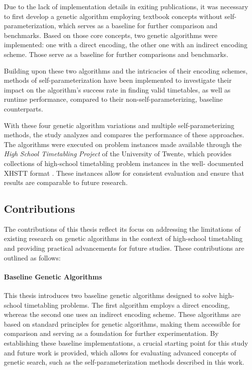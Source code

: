 \documentclass[english,examples]{isasthesis}
\begin{document}
Due to the lack of implementation details in exiting publications,
it was necessary to first develop a genetic algorithm employing
textbook concepts without self-parameterization, which serves as a
baseline for further comparison and benchmarks.
Based on those core concepts, two genetic algorithms were implemented:
one with a direct encoding, the other one with an indirect encoding scheme.
Those serve as a baseline for further comparisons and benchmarks.

Building upon these two algorithms and the intricacies of their encoding
schemes, methods of self-parameterization have been implemented to investigate
their impact on the algorithm's success rate in finding valid timetables,
as well as runtime performance, compared to their non-self-parameterizing,
baseline counterparts.

With these four genetic algorithm variations and multiple self-parameterizing
methods, the study analyzes and compares the performance of these approaches.
The algorithms were executed on problem instances made available through the
\textit{High School Timetabling Project} of the University of Twente, which
provides collections of high-school timetabling problem instances in the well-
documented XHSTT format \cite{xhsttTwenteWeb,xhsttDocs}.
These instances allow for consistent evaluation and ensure that results are
comparable to future research.

\subsection{Contributions}
The contributions of this thesis reflect its focus on addressing the limitations
of existing research on genetic algorithms in the context of high-school
timetabling and providing practical advancements for future studies. These
contributions are outlined as follows:

\paragraph{Baseline Genetic Algorithms}
This thesis introduces two baseline genetic algorithms designed to solve
high-school timetabling problems. The first algorithm employs a direct encoding,
whereas the second one uses an indirect encoding scheme. These algorithms
are based on standard principles for genetic algorithms, making them
accessible for comparison and serving as a foundation for further
experimentation.
By establishing these baseline implementations,
a crucial starting point for this study and future work is provided, which
allows for evaluating advanced concepts of genetic search, such as the
self-parameterization methods described in this work.
\end{document}
